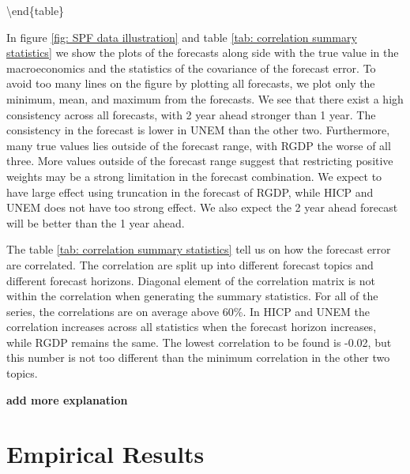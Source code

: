 \documentclass[]{article}
\begin{document}
\textbackslash{}end\{table\}

In figure \autoref{fig: SPF data illustration} and table
\autoref{tab: correlation summary statistics} we show the plots of the
forecasts along side with the true value in the macroeconomics and the
statistics of the covariance of the forecast error. To avoid too many
lines on the figure by plotting all forecasts, we plot only the minimum,
mean, and maximum from the forecasts. We see that there exist a high
consistency across all forecasts, with 2 year ahead stronger than 1
year. The consistency in the forecast is lower in UNEM than the other
two. Furthermore, many true values lies outside of the forecast range,
with RGDP the worse of all three. More values outside of the forecast
range suggest that restricting positive weights may be a strong
limitation in the forecast combination. We expect to have large effect
using truncation in the forecast of RGDP, while HICP and UNEM does not
have too strong effect. We also expect the 2 year ahead forecast will be
better than the 1 year ahead.

The table \autoref{tab: correlation summary statistics} tell us on how
the forecast error are correlated. The correlation are split up into
different forecast topics and different forecast horizons. Diagonal
element of the correlation matrix is not within the correlation when
generating the summary statistics. For all of the series, the
correlations are on average above 60\%. In HICP and UNEM the correlation
increases across all statistics when the forecast horizon increases,
while RGDP remains the same. The lowest correlation to be found is
-0.02, but this number is not too different than the minimum correlation
in the other two topics.

\textbf{add more explanation}

\hypertarget{empirical-results}{%
\section{Empirical Results}\label{empirical-results}}
\end{document}
